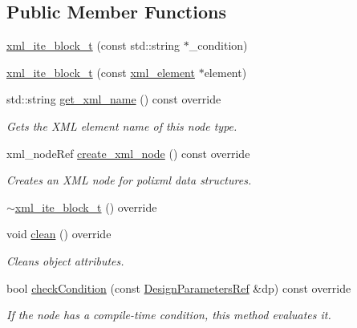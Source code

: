 \subsection*{Public Member Functions}
\begin{DoxyCompactItemize}
\item 
\hyperlink{classxml__ite__block__t_a57afc4e1f0e0a6aa1b5441c96166f8eb}{xml\+\_\+ite\+\_\+block\+\_\+t} (const std\+::string $\ast$\+\_\+condition)
\item 
\hyperlink{classxml__ite__block__t_ade36bd6a315c96d5c3944f8283146cc1}{xml\+\_\+ite\+\_\+block\+\_\+t} (const \hyperlink{classxml__element}{xml\+\_\+element} $\ast$element)
\item 
std\+::string \hyperlink{classxml__ite__block__t_a82a199264ab67116550596a27ff2b051}{get\+\_\+xml\+\_\+name} () const override
\begin{DoxyCompactList}\small\item\em Gets the X\+ML element name of this node type. \end{DoxyCompactList}\item 
xml\+\_\+node\+Ref \hyperlink{classxml__ite__block__t_a1b9744c412acd0ded712ab4c8956ce27}{create\+\_\+xml\+\_\+node} () const override
\begin{DoxyCompactList}\small\item\em Creates an X\+ML node for polixml data structures. \end{DoxyCompactList}\item 
\hyperlink{classxml__ite__block__t_afb50b8f16b557077cd0b9f31250dcb15}{$\sim$xml\+\_\+ite\+\_\+block\+\_\+t} () override
\item 
void \hyperlink{classxml__ite__block__t_ab5a5590475fc25a5601daefd8a0deac3}{clean} () override
\begin{DoxyCompactList}\small\item\em Cleans object attributes. \end{DoxyCompactList}\item 
bool \hyperlink{classxml__ite__block__t_a8f68c01acc36d5dba8b1161994d65d17}{check\+Condition} (const \hyperlink{DesignParameters_8hpp_ae36bb1c4c9150d0eeecfe1f96f42d157}{Design\+Parameters\+Ref} \&dp) const override
\begin{DoxyCompactList}\small\item\em If the node has a compile-\/time condition, this method evaluates it. \end{DoxyCompactList}\end{DoxyCompactItemize}
